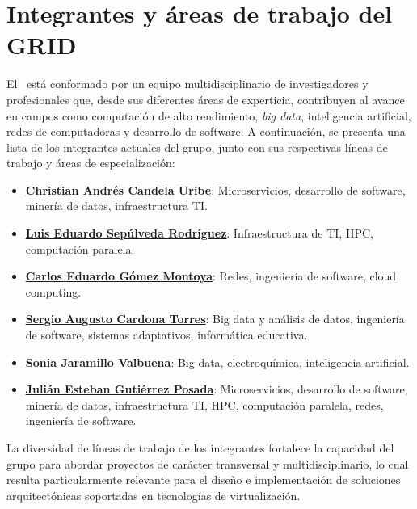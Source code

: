 

\section{Integrantes y áreas de trabajo del GRID}
El \GRID\ está conformado por un equipo multidisciplinario de investigadores y profesionales que, desde sus diferentes áreas de experticia, contribuyen al avance en campos como computación de alto rendimiento, \textit{big data}, inteligencia artificial, redes de computadoras y desarrollo de software. A continuación, se presenta una lista de los integrantes actuales del grupo, junto con sus respectivas líneas de trabajo y áreas de especialización:
\begin{itemize}
	\item \href{https://scienti.minciencias.gov.co/cvlac/visualizador/generarCurriculoCv.do?cod_rh=0000210897}{\underline{{\textbf{Christian Andrés Candela Uribe}}}}: Microservicios, desarrollo de software, minería de datos, infraestructura TI.\@
	\item \href{https://scienti.minciencias.gov.co/cvlac/visualizador/generarCurriculoCv.do?cod_rh=0001383939}{\underline{{\textbf{Luis Eduardo Sepúlveda Rodríguez}}}}: Infraestructura de TI, HPC, computación paralela.
	\item \href{https://scienti.minciencias.gov.co/cvlac/visualizador/generarCurriculoCv.do?cod_rh=0001343801}{\underline{{\textbf{Carlos Eduardo Gómez Montoya}}}}: Redes, ingeniería de software, cloud computing.
	\item \href{https://scienti.minciencias.gov.co/cvlac/visualizador/generarCurriculoCv.do?cod_rh=0001398775}{\underline{{\textbf{Sergio Augusto Cardona Torres}}}}: Big data y análisis de datos, ingeniería de software, sistemas adaptativos, informática educativa.
	\item \href{https://scienti.minciencias.gov.co/cvlac/visualizador/generarCurriculoCv.do?cod_rh=0000193550}{\underline{{\textbf{Sonia Jaramillo Valbuena}}}}: Big data, electroquímica, inteligencia artificial.
	\item \href{https://scienti.minciencias.gov.co/cvlac/visualizador/generarCurriculoCv.do?cod_rh=0000283495}{\underline{{\textbf{Julián Esteban Gutiérrez Posada}}}}: Microservicios, desarrollo de software, minería de datos, infraestructura TI, HPC, computación paralela, redes, ingeniería de software.
\end{itemize}

La diversidad de líneas de trabajo de los integrantes fortalece la capacidad del grupo para abordar proyectos de carácter transversal y multidisciplinario, lo cual resulta particularmente relevante para el diseño e implementación de soluciones arquitectónicas soportadas en tecnologías de virtualización.


